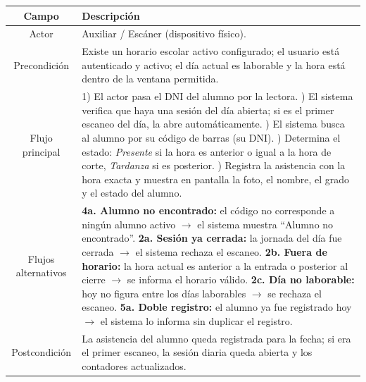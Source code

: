 \documentclass[a4paper,12pt]{article}
\begin{document}
\begin{table}[H]
\centering
\begin{tabularx}{\linewidth}{C X}
\toprule
\textbf{Campo} & \textbf{Descripción} \\
\midrule
Actor & Auxiliar / Escáner (dispositivo físico). \\
\addlinespace
Precondición &
  Existe un horario escolar activo configurado; el usuario está autenticado y
  activo; el día actual es laborable y la hora está dentro de la ventana
  permitida. \\
\addlinespace
Flujo principal &
  1) El actor pasa el DNI del alumno por la lectora. ) El sistema verifica que haya una sesión del día abierta; si es el primer
     escaneo del día, la abre automáticamente. ) El sistema busca al alumno por su código de barras (su DNI). ) Determina el estado: \textit{Presente} si la hora es anterior o igual a
     la hora de corte, \textit{Tardanza} si es posterior. ) Registra la asistencia con la hora exacta y muestra en pantalla la foto,
     el nombre, el grado y el estado del alumno. \\
\addlinespace
Flujos alternativos &
  \textbf{4a. Alumno no encontrado:} el código no corresponde a ningún alumno
  activo $\rightarrow$ el sistema muestra ``Alumno no encontrado''. \newline
  \textbf{2a. Sesión ya cerrada:} la jornada del día fue cerrada $\rightarrow$
  el sistema rechaza el escaneo. \newline
  \textbf{2b. Fuera de horario:} la hora actual es anterior a la entrada o
  posterior al cierre $\rightarrow$ se informa el horario válido. \newline
  \textbf{2c. Día no laborable:} hoy no figura entre los días laborables
  $\rightarrow$ se rechaza el escaneo. \newline
  \textbf{5a. Doble registro:} el alumno ya fue registrado hoy $\rightarrow$ el
  sistema lo informa sin duplicar el registro. \\
\addlinespace
Postcondición &
  La asistencia del alumno queda registrada para la fecha; si era el primer
  escaneo, la sesión diaria queda abierta y los contadores actualizados. \\
\bottomrule
\end{tabularx}
\end{table}
\end{document}
